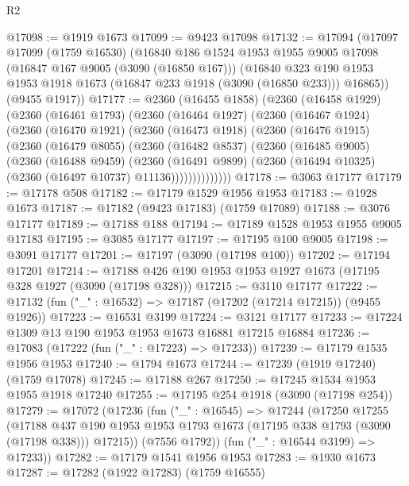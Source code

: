 \begin{lexlean}{R2}
\begin{coremodule}
@17098 := @1919 @1673
@17099 := @9423 @17098
@17132 := @17094
    (@17097
      @17099
      (@1759 @16530)
      (@16840
        @186
        @1524
        @1953
        @1955
        @9005
        @17098
        (@16847 @167 @9005 (@3090 (@16850 @167)))
        (@16840 @323 @190 @1953 @1953 @1918 @1673 (@16847 @233 @1918 (@3090 (@16850 @233))) @16865))
      (@9455 @1917))
@17177 := @2360
    (@16455 @1858)
    (@2360
      (@16458 @1929)
      (@2360
        (@16461 @1793)
        (@2360
          (@16464 @1927)
          (@2360
            (@16467 @1924)
            (@2360
              (@16470 @1921)
              (@2360
                (@16473 @1918)
                (@2360
                  (@16476 @1915)
                  (@2360
                    (@16479 @8055)
                    (@2360
                      (@16482 @8537)
                      (@2360
                        (@16485 @9005)
                        (@2360
                          (@16488 @9459)
                          (@2360
                            (@16491 @9899)
                            (@2360 (@16494 @10325) (@2360 (@16497 @10737) @11136))))))))))))))
@17178 := @3063 @17177
@17179 := @17178 @508
@17182 := @17179 @1529 @1956 @1953
@17183 := @1928 @1673
@17187 := @17182 (@9423 @17183) (@1759 @17089)
@17188 := @3076 @17177
@17189 := @17188 @188
@17194 := @17189 @1528 @1953 @1955 @9005 @17183
@17195 := @3085 @17177
@17197 := @17195 @100 @9005
@17198 := @3091 @17177
@17201 := @17197 (@3090 (@17198 @100))
@17202 := @17194 @17201
@17214 := @17188 @426 @190 @1953 @1953 @1927 @1673 (@17195 @328 @1927 (@3090 (@17198 @328)))
@17215 := @3110 @17177
@17222 := @17132 (fun ("_" : @16532) => @17187 (@17202 (@17214 @17215)) (@9455 @1926))
@17223 := @16531 @3199
@17224 := @3121 @17177
@17233 := @17224 @1309 @13 @190 @1953 @1953 @1673 @16881 @17215 @16884
@17236 := @17083 (@17222 (fun ("_" : @17223) => @17233))
@17239 := @17179 @1535 @1956 @1953
@17240 := @1794 @1673
@17244 := @17239 (@1919 @17240) (@1759 @17078)
@17245 := @17188 @267
@17250 := @17245 @1534 @1953 @1955 @1918 @17240
@17255 := @17195 @254 @1918 (@3090 (@17198 @254))
@17279 := @17072
    (@17236
      (fun ("_" : @16545) =>
      @17244
        (@17250
          @17255
          (@17188
            @437
            @190
            @1953
            @1953
            @1793
            @1673
            (@17195 @338 @1793 (@3090 (@17198 @338)))
            @17215))
        (@7556 @1792))
      (fun ("_" : @16544 @3199) => @17233))
@17282 := @17179 @1541 @1956 @1953
@17283 := @1930 @1673
@17287 := @17282 (@1922 @17283) (@1759 @16555)

\end{coremodule}
\end{lexlean}
